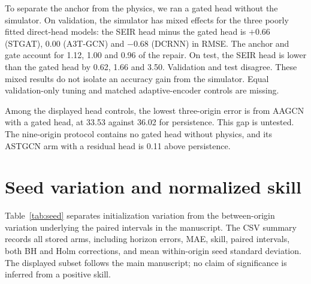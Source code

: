 \documentclass[conference]{IEEEtran}
\begin{document}


To separate the anchor from the physics, we ran a gated head without the simulator.
On validation, the simulator has mixed effects for the three poorly fitted direct-head models: the SEIR head minus the gated head is $+0.66$ (STGAT), $0.00$ (A3T-GCN) and $-0.68$ (DCRNN) in RMSE. %
The anchor and gate account for 1.12, 1.00 and 0.96 of the repair. %
On test, the SEIR head is lower than the gated head by 0.62, 1.66 and 3.50. %
Validation and test disagree.
These mixed results do not isolate an accuracy gain from the simulator.
Equal validation-only tuning and matched adaptive-encoder controls are missing.

Among the displayed head controls, the lowest three-origin error is from AAGCN with a gated head, at 33.53 against 36.02 for persistence. %
This gap is untested.
The nine-origin protocol contains no gated head without physics, and its ASTGCN arm with a residual head is 0.11 above persistence. %


\section{Seed variation and normalized skill}
Table~\ref{tab:seed} separates initialization variation from the between-origin variation underlying the paired intervals in the manuscript.
The CSV summary records all stored arms, including horizon errors, MAE, skill, paired intervals, both BH and Holm corrections, and mean within-origin seed standard deviation.
The displayed subset follows the main manuscript; no claim of significance is inferred from a positive skill.

\end{document}
